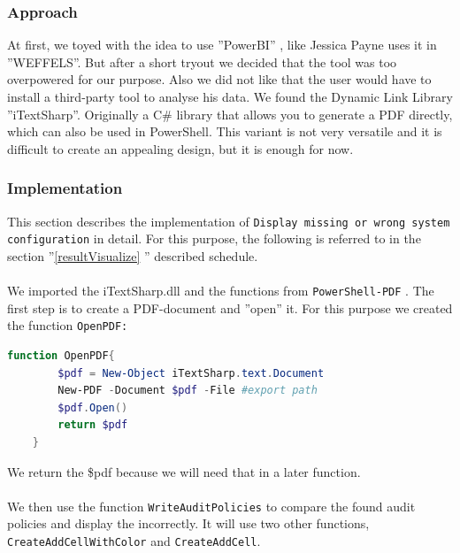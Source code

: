 \subsubsection{Approach}
At first, we toyed with the idea to use ''PowerBI'' \cite{PowerBI}, like Jessica Payne uses it in ''WEFFELS''. But after a short tryout we decided that the tool was too overpowered for our purpose. Also we did not like that the user would have to install a third-party tool to analyse his data. We found the Dynamic Link Library ''iTextSharp''. Originally a C\# library that allows you to generate a PDF directly, which can also be used in PowerShell. This variant is not very versatile and it is difficult to create an appealing design, but it is enough for now. 
\subsubsection{Implementation}
This section describes the implementation of \lstinline|Display missing or wrong system configuration| in detail. For this purpose, the following is referred to in the section ''\ref{resultVisualize} '' described schedule. \\\\
We imported the iTextSharp.dll and the functions from \lstinline|PowerShell-PDF| \cite{PowerShell-PDF}. The first step is to create a PDF-document and ''open'' it. For this purpose we created the function \lstinline|OpenPDF:|
\begin{lstlisting}[caption=Function OpenPDF, language=PowerShell]
    function OpenPDF{
        $pdf = New-Object iTextSharp.text.Document 
        New-PDF -Document $pdf -File #export path
        $pdf.Open()
        return $pdf
    }
\end{lstlisting}
We return the \$pdf because we will need that in a later function.\\\\
We then use the function \lstinline|WriteAuditPolicies| to compare the found audit policies and display the incorrectly. It will use two other functions, \lstinline|CreateAddCellWithColor| and \lstinline|CreateAddCell|.
